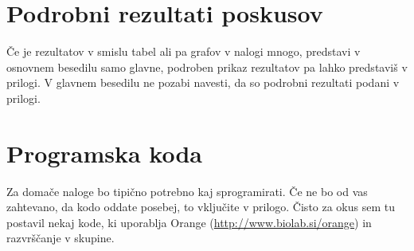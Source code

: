 \documentclass[a4paper,11pt]{article}
\begin{document}
\appendix
\appendixpage
\section{\label{app-res}Podrobni rezultati poskusov}

Če je rezultatov v smislu tabel ali pa grafov v nalogi mnogo,
predstavi v osnovnem besedilu samo glavne, podroben prikaz
rezultatov pa lahko predstaviš v prilogi. V glavnem besedilu ne
pozabi navesti, da so podrobni rezultati podani v prilogi.

\section{Programska koda}

Za domače naloge bo tipično potrebno kaj sprogramirati. Če ne bo od
vas zahtevano, da kodo oddate posebej, to vključite v prilogo. Čisto
za okus sem tu postavil nekaj kode, ki uporablja Orange
(\url{http://www.biolab.si/orange}) in razvrščanje v skupine.




\end{document}
